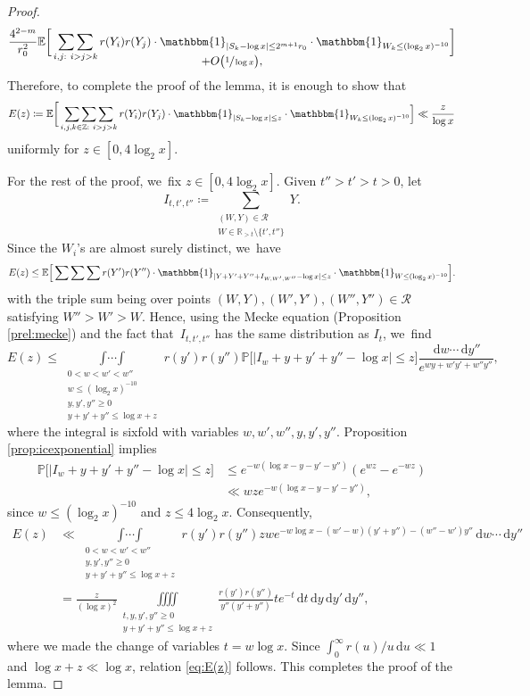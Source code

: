 \documentclass[10pt,a4paper]{article}
\newcommand{\ZZ}{\mathbb{Z}}
\newcommand{\RR}{\mathbb{R}}
\newcommand{\PP}{\mathbb{P}}
\newcommand{\EE}{\mathbb{E}}
\newcommand{\dee}{\,\mathrm{d}}
\newcommand{\one}{\mathbbm{1}}
\newcommand{\RS}{\mathscr{R}}
\newcommand{\bg}{\big}
\newcommand{\bgg}{\Big}
\newcommand{\bggg}{\bigg}
\theoremstyle{plain}
\theoremstyle{definition}
\begin{document}
\begin{proof}
\begin{multline*}
\frac{4^{2-m}}{r_0^2} \EE\bggg[ \mathop{\sum\sum}_{i,j :\ i>j>k}r(Y_i)r(Y_j) \cdot \one_{|S_k-\log x|\le 2^{m+1}r_0} \cdot \one_{W_k \le (\log_2x)^{-10}} \bggg] \\[-10pt]
+O\bg(\sfrac{1}{\log x}\bg),
\end{multline*}
Therefore, to complete the proof of the lemma, it is enough to show that
\begin{equation}
\label{eq:E(z)}
E(z) \coloneqq \EE \bggg[\mathop{\sum\sum\sum}_{\substack{i, j, k \in \ZZ:\ i>j>k}}r(Y_i)r(Y_j) \cdot \one_{|S_k-\log x|\le z} \cdot \one_{W_k \le (\log_2x)^{-10}} \bgg] \ll \frac{z}{\log x}
\end{equation}
uniformly for $z\in[0,4\log_2x]$.

For the rest of the proof, we~fix $z\in[0,4\log_2x]$.
Given $t''>t'>t > 0$, let
\[
I_{t,t',t''}\coloneqq \sum_{\substack{(W,Y)\in\RS\\ W\in\RR_{>t}\setminus\{t',t''\}}} Y.
\]
Since the $W_i$'s are almost surely distinct, we~have
\begin{align*}
E(z) \le \EE\bgg[ \mathop{\sum\sum\sum}
r(Y')r(Y'') \cdot \one_{|Y+Y'+Y''+I_{W,W',W''}-\log x|\le z} \cdot \one_{W \le (\log_2x)^{-10}} \bgg].
\end{align*}
with the triple sum being over points $(W,Y),(W',Y'),(W'',Y'')\in\RS$ satisfying \hbox{$W''>W'>W$}. Hence, using the Mecke equation (Proposition \ref{prel:mecke}) and the fact that~$I_{t, t', t''}$ has the same distribution as $I_{t}$, we~find
\[
E(z) \le \mathop{\int\cdots\int}\limits_{\substack{0<w<w'<w'' \\ w\le (\log_2x)^{-10} \\ y,y',y''\ge0 \\ y+y'+y''\le \log x+z }} r(y')r(y'')
\PP\bgg[ \bg|I_w+y+y'+y''-\log x\bg|\le z\bgg]
\frac{\dee w\cdots \dee y''}{ e^{wy+w'y'+w''y''}},
\]
where the integral is sixfold with variables $w,w',w'',y,y',y''$. Proposition \ref{prop:icexponential} implies
\begin{align*}
\PP\bgg[ \bg|I_w+y+y'+y''-\log x\bg|\le z\bgg] &\le e^{-w(\log x-y-y'-y'')} (e^{wz}-e^{-wz}) \\
&\ll wz e^{-w(\log x-y-y'-y'')},
\end{align*}
since $w\le(\log_2x)^{-10}$ and $z\le 4\log_2x$. Consequently,
\[
\begin{split}
E(z) &\ll
\mathop{\int\cdots\int}\limits_{\substack{0<w<w'<w'' \\ y,y',y''\ge0 \\ y+y'+y''\le \log x+z }} r(y')r(y'')
zwe^{-w\log x-(w'-w)(y'+y'')-(w''-w')y''}\dee w\cdots \dee y'' \\
&= \frac{z}{(\log x)^2} \iiiint\limits_{\substack{t,y,y',y''\ge 0 \\ y+y'+y''\le \log x+z }} \frac{r(y')r(y'')}{y''(y'+y'')}
t e^{-t} \dee t\dee y\dee y'\dee y'',
\end{split}
\]
where we made the change of variables $t=w\log x$. Since $\int_0^\infty r(u)/u \dee u\ll 1$ and $\log x+z\ll\log x$, relation \eqref{eq:E(z)} follows. This completes the proof of the lemma.
\end{proof}
\end{document}
